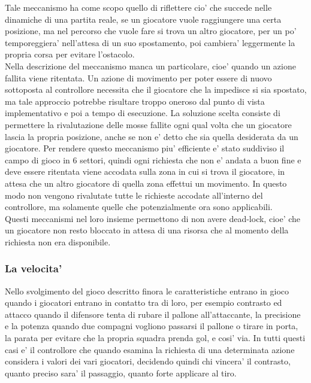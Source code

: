 Tale meccanismo ha come scopo quello di riflettere cio' che succede nelle dinamiche di una partita reale, se un giocatore vuole raggiungere una certa posizione, ma nel percorso che vuole fare si trova un altro giocatore, per un po' temporeggiera' nell'attesa di un suo spostamento, poi cambiera' leggermente la propria corsa per evitare l'ostacolo.\\

Nella descrizione del meccanismo manca un particolare, cioe' quando un azione fallita viene ritentata. Un azione di movimento per poter essere di nuovo sottoposta al controllore necessita che il giocatore che la impedisce si sia spostato, ma tale approccio potrebbe risultare troppo oneroso dal punto di vista implementativo e poi a tempo di esecuzione. La soluzione scelta consiste di permettere la rivalutazione delle mosse fallite ogni qual volta che un giocatore lascia la propria posizione, anche se non e' detto che sia quella desiderata da un giocatore. Per rendere questo meccanismo piu' efficiente e' stato suddiviso il campo di gioco in 6 settori, quindi ogni richiesta che non e' andata a buon fine e deve essere ritentata viene accodata sulla zona in cui si trova il giocatore, in attesa che un altro giocatore di quella zona effettui un movimento. In questo modo non vengono rivalutate tutte le richieste accodate all'interno del controllore, ma solamente quelle che potenzialmente ora sono applicabili.\\

Questi meccanismi nel loro insieme permettono di non avere dead-lock, cioe' che un giocatore non resto bloccato in attesa di una risorsa che al momento della richiesta non era disponibile.

\subsubsection{La velocita'}
\label{sec:analisi_concorrenza_velocita}

Nello svolgimento del gioco descritto finora le caratteristiche entrano in gioco quando i giocatori entrano in contatto tra di loro, per esempio contrasto ed attacco quando il difensore tenta di rubare il pallone all'attaccante, la precisione e la potenza quando due compagni vogliono passarsi il pallone o tirare in porta, la parata per evitare che la propria squadra prenda gol, e cosi' via. In tutti questi casi e' il controllore che quando esamina la richiesta di una determinata azione considera i valori dei vari giocatori, decidendo quindi chi vincera' il contrasto, quanto preciso sara' il passaggio, quanto forte applicare al tiro.\\

